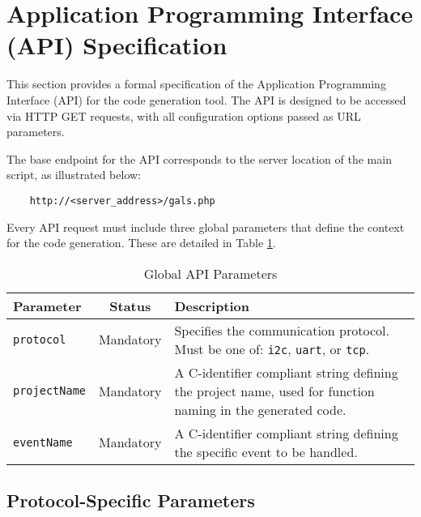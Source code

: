 
\section{Application Programming Interface (API) Specification}
\label{sec:api_spec}

This section provides a formal specification of the Application Programming Interface (API) for the code generation tool. The API is designed to be accessed via HTTP GET requests, with all configuration options passed as URL parameters.

The base endpoint for the API corresponds to the server location of the main script, as illustrated below:
\begin{verbatim}
    http://<server_address>/gals.php
\end{verbatim}

Every API request must include three global parameters that define the context for the code generation. These are detailed in Table \ref{tab:global_params}.

\begin{table}[h!]
    \centering
    \caption{Global API Parameters}
    \label{tab:global_params}
    \begin{tabular}{|l|c|p{9cm}|}
        \hline
        \textbf{Parameter} & \textbf{Status} & \textbf{Description} \\ \hline
        \texttt{protocol} & Mandatory & Specifies the communication protocol. Must be one of: \texttt{i2c}, \texttt{uart}, or \texttt{tcp}. \\ \hline
        \texttt{projectName} & Mandatory & A C-identifier compliant string defining the project name, used for function naming in the generated code. \\ \hline
        \texttt{eventName} & Mandatory & A C-identifier compliant string defining the specific event to be handled. \\ \hline
    \end{tabular}
\end{table}

\subsection{Protocol-Specific Parameters}
\label{subsec:protocol_params}

